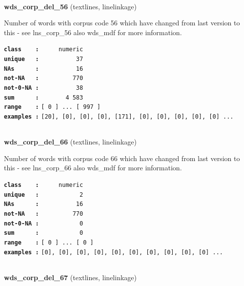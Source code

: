 \documentclass[]{article}
\begin{document}
~

\textbf{wds\_corp\_del\_56} (textlines, linelinkage)

Number of words with corpus code 56 which have changed from last version
to this - see lns\_corp\_56 also wds\_mdf for more information.

\textbf{\texttt{class\ \ \ \ :}} \texttt{~~~~~numeric}\\
\textbf{\texttt{unique\ \ \ :}} \texttt{~~~~~~~~~~37}\\
\textbf{\texttt{NAs\ \ \ \ \ \ :}} \texttt{~~~~~~~~~~16}\\
\textbf{\texttt{not-NA\ \ \ :}} \texttt{~~~~~~~~~770}\\
\textbf{\texttt{not-0-NA\ :}} \texttt{~~~~~~~~~~38}\\
\textbf{\texttt{sum\ \ \ \ \ \ :}} \texttt{~~~~~~~4~583}\\
\textbf{\texttt{range\ \ \ \ :}}
\texttt{{[}\ 0\ {]}\ ...\ {[}\ 997\ {]}}\\
\textbf{\texttt{examples\ :}}
\texttt{{[}20{]},\ {[}0{]},\ {[}0{]},\ {[}0{]},\ {[}171{]},\ {[}0{]},\ {[}0{]},\ {[}0{]},\ {[}0{]},\ {[}0{]}\ ...}\\

~

\textbf{wds\_corp\_del\_66} (textlines, linelinkage)

Number of words with corpus code 66 which have changed from last version
to this - see lns\_corp\_66 also wds\_mdf for more information.

\textbf{\texttt{class\ \ \ \ :}} \texttt{~~~~~numeric}\\
\textbf{\texttt{unique\ \ \ :}} \texttt{~~~~~~~~~~~2}\\
\textbf{\texttt{NAs\ \ \ \ \ \ :}} \texttt{~~~~~~~~~~16}\\
\textbf{\texttt{not-NA\ \ \ :}} \texttt{~~~~~~~~~770}\\
\textbf{\texttt{not-0-NA\ :}} \texttt{~~~~~~~~~~~0}\\
\textbf{\texttt{sum\ \ \ \ \ \ :}} \texttt{~~~~~~~~~~~0}\\
\textbf{\texttt{range\ \ \ \ :}}
\texttt{{[}\ 0\ {]}\ ...\ {[}\ 0\ {]}}\\
\textbf{\texttt{examples\ :}}
\texttt{{[}0{]},\ {[}0{]},\ {[}0{]},\ {[}0{]},\ {[}0{]},\ {[}0{]},\ {[}0{]},\ {[}0{]},\ {[}0{]},\ {[}0{]}\ ...}\\

~

\textbf{wds\_corp\_del\_67} (textlines, linelinkage)
\end{document}
